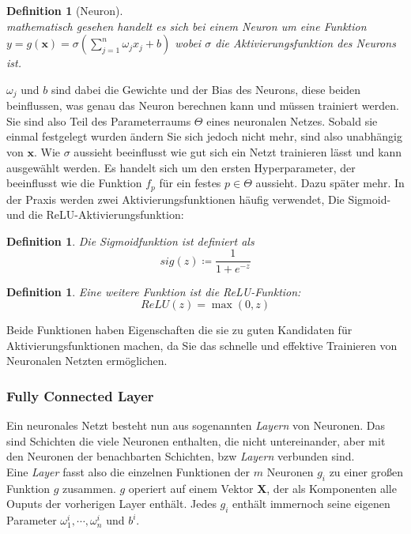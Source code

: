\documentclass[]{scrartcl}
\newtheorem{defi}[satz]{Definition}
\begin{document}

			\begin{defi}[Neuron] ~\\
				mathematisch gesehen handelt es sich bei einem Neuron um eine Funktion\\
				$y = g(\mathbf{x}) = \sigma(\sum_{j=1}^n \omega_jx_j + b)$ wobei $\sigma$ die Aktivierungsfunktion des Neurons ist.
			\end{defi}

			$\omega_j$ und $b$ sind dabei die Gewichte und der Bias des Neurons, diese beiden beinflussen, was genau das Neuron berechnen kann und müssen trainiert werden.
			Sie sind also Teil des Parameterraums $\Theta$ eines neuronalen Netzes.
			Sobald sie einmal festgelegt wurden ändern Sie sich jedoch nicht mehr, sind also unabhängig von $\mathbf{x}$.
			Wie $\sigma$ aussieht beeinflusst wie gut sich ein Netzt trainieren lässt und kann ausgewählt werden.
			Es handelt sich um den ersten Hyperparameter, der beeinflusst wie die Funktion $f_p$ für ein festes $p \in \Theta$ aussieht. Dazu später mehr.
			In der Praxis werden zwei Aktivierungsfunktionen häufig verwendet, Die Sigmoid- und die ReLU-Aktivierungsfunktion:

			\begin{defi}
				Die Sigmoidfunktion ist definiert als \\
				$$sig(z) \coloneqq \frac{1}{1+e^{-z}}$$
			\end{defi}
			\begin{defi}
				Eine weitere Funktion ist die ReLU-Funktion: \\
				$$ReLU(z) = \max(0, z)$$
			\end{defi}

			Beide Funktionen haben Eigenschaften die sie zu guten Kandidaten für Aktivierungsfunktionen machen, da Sie das schnelle und effektive Trainieren von Neuronalen Netzten ermöglichen.

		\subsubsection{Fully Connected Layer}

			Ein neuronales Netzt besteht nun aus sogenannten \textit{Layern} von Neuronen. Das sind Schichten die viele Neuronen enthalten, die nicht untereinander, aber mit den
			Neuronen der benachbarten Schichten, bzw \textit{Layern} verbunden sind. \\
			Eine \textit{Layer} fasst also die einzelnen Funktionen der $m$ Neuronen $g_i$ zu einer großen Funktion $g$ zusammen.
			$g$ operiert auf einem Vektor $\mathbf{X}$, der als Komponenten alle Ouputs der vorherigen Layer enthält.
			Jedes $g_i$ enthält immernoch seine eigenen Parameter $\omega_1^i, \cdots, \omega_n^i$ und $b^i$.
			
\end{document}
